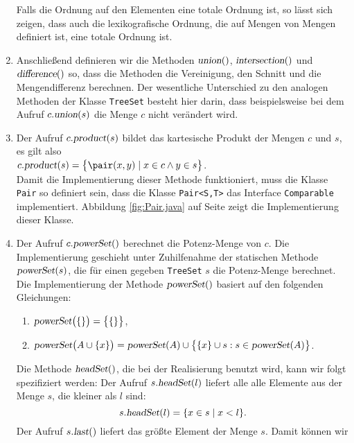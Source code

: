 \begin{enumerate}
      Falls die Ordnung auf den Elementen eine totale Ordnung ist, so l\"asst sich zeigen,
      dass auch die lexikografische Ordnung, die auf Mengen von Mengen definiert ist, eine
      totale Ordnung ist. 
\item Anschlie{\ss}end definieren wir die Methoden 
      $\textsl{union}()$,
      $\textsl{intersection}()$ und
      $\textsl{difference}()$ so, dass die Methoden  die Vereinigung, den Schnitt und die
      Mengendifferenz berechnen.  Der wesentliche Unterschied zu den analogen Methoden der
      Klasse \texttt{TreeSet} besteht hier darin, dass beispielsweise bei dem Aufruf 
      $c.\textsl{union}(s)$ die Menge $c$ nicht ver\"andert wird.
\item Der Aufruf $c.\textsl{product}(s)$ bildet das kartesische Produkt der Mengen
      $c$ und $s$, es gilt also 
      \\[0.2cm]
      \hspace*{1.3cm}
      $c.\textsl{product}(s) = \bigl\{ \pair(x,y) \mid x \in c \wedge y \in s \bigr\}$.
      \\[0.2cm]
      Damit die Implementierung dieser Methode funktioniert,  muss die Klasse \texttt{Pair} so definiert
      sein, dass die Klasse \texttt{Pair<S,T>} das Interface \texttt{Comparable} implementiert.
      Abbildung  \ref{fig:Pair.java} auf Seite \pageref{fig:Pair.java} zeigt die Implementierung dieser Klasse.
\item Der Aufruf $c.\textsl{powerSet}()$ berechnet die Potenz-Menge von $c$.
      Die Implementierung geschieht unter Zuhilfenahme der statischen Methode
      $\textsl{powerSet}(s)$, die f\"ur einen gegeben \texttt{TreeSet} $s$ die Potenz-Menge 
      berechnet. Die Implementierung der Methode $\textsl{powerSet}()$ basiert auf den folgenden Gleichungen:
      \begin{enumerate}
      \item $\textsl{powerSet}\bigl(\{\}\bigr) = \bigl\{ \{\} \bigr\}$,
      \item $\textsl{powerSet}\bigl(A \cup \{x\} \bigr) = 
             \textsl{powerSet}(A) \cup \bigl\{ \{x\} \cup s : s \in \textsl{powerSet}(A) \bigr\}$.
      \end{enumerate}
      Die Methode $\textsl{headSet}()$, die bei der Realisierung benutzt wird, kann wir
      folgt spezifiziert werden: Der Aufruf $s.\textsl{headSet}(l)$ liefert alle alle
      Elemente aus der Menge $s$, die kleiner als $l$ sind:
      \[ s.\textsl{headSet}(l) = \{ x \in s \mid x < l \}. \]
      Der Aufruf $s.\textsl{last}()$ liefert das gr\"o{\ss}te Element der Menge $s$.  Damit k\"onnen wir

\end{enumerate}
